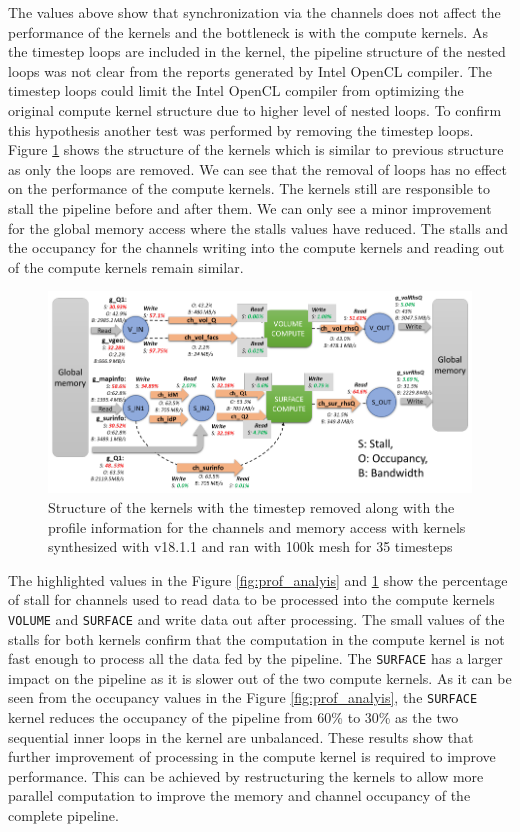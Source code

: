 The values above show that synchronization via the channels does not affect
the performance of the kernels and the bottleneck is with the compute
kernels. As the timestep loops are included in the kernel,  the pipeline
structure of the nested loops was not clear from the reports generated
by Intel OpenCL compiler. The timestep loops could limit the Intel OpenCL compiler
from optimizing the original compute kernel structure due to higher level of nested
loops. To confirm this hypothesis another test was performed by removing the timestep
loops. Figure \ref{fig:prof_analyis_2} shows the structure of the kernels which
is similar to previous structure as only the loops are removed. We can see that
the removal of loops has no effect on the performance of the compute kernels.
The kernels still are responsible to stall the pipeline before and after them.
We can only see a minor improvement for the global memory access where the stalls
values have reduced. The stalls and the occupancy for the channels writing into the compute kernels
and reading out of the compute kernels remain similar.

\begin{figure}[]%
    \centering
    \includegraphics[width=1.0\textwidth]{images/bottleneck_analysis_noloops}
    \caption{Structure of the kernels with the timestep removed along with the profile
    information for the channels and memory access with kernels synthesized
    with v18.1.1 and ran with 100k mesh for 35 timesteps}
    \label{fig:prof_analyis_2}
\end{figure}

The highlighted values in the Figure \ref{fig:prof_analyis} and \ref{fig:prof_analyis_2}
show the percentage of stall for channels used to read data to be processed into the
compute kernels \texttt{VOLUME} and \texttt{SURFACE}
and write data out after processing. The small values of the stalls for both kernels
confirm that the computation in the compute kernel is not fast enough to process
all the data fed by the pipeline. The \texttt{SURFACE} has a larger impact on the pipeline as it is slower
out of the two compute kernels. As it can be seen from the occupancy values in the Figure \ref{fig:prof_analyis},
the \texttt{SURFACE} kernel reduces the occupancy of the pipeline from 60\% to 30\% as the
two sequential inner loops in the kernel are unbalanced.
These results show that further improvement of processing in the compute kernel
is required to improve performance. This can be achieved by restructuring the kernels to allow
more parallel computation to improve the memory and channel occupancy of the complete
pipeline.